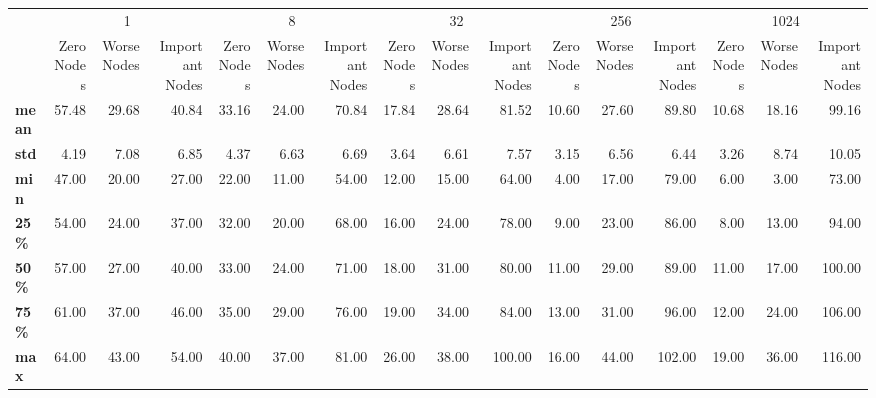 \begin{tabular}{lrrrrrrrrrrrrrrr}
\toprule
{} & \multicolumn{3}{c}{1} & \multicolumn{3}{c}{8} & \multicolumn{3}{c}{32} & \multicolumn{3}{c}{256} & \multicolumn{3}{c}{1024} \\
{} & Zero Nodes & Worse Nodes & Important Nodes & Zero Nodes & Worse Nodes & Important Nodes & Zero Nodes & Worse Nodes & Important Nodes & Zero Nodes & Worse Nodes & Important Nodes & Zero Nodes & Worse Nodes & Important Nodes \\
\midrule
\textbf{mean} &      57.48 &       29.68 &           40.84 &      33.16 &       24.00 &           70.84 &      17.84 &       28.64 &           81.52 &      10.60 &       27.60 &           89.80 &      10.68 &       18.16 &           99.16 \\
\textbf{std } &       4.19 &        7.08 &            6.85 &       4.37 &        6.63 &            6.69 &       3.64 &        6.61 &            7.57 &       3.15 &        6.56 &            6.44 &       3.26 &        8.74 &           10.05 \\
\textbf{min } &      47.00 &       20.00 &           27.00 &      22.00 &       11.00 &           54.00 &      12.00 &       15.00 &           64.00 &       4.00 &       17.00 &           79.00 &       6.00 &        3.00 &           73.00 \\
\textbf{25\% } &      54.00 &       24.00 &           37.00 &      32.00 &       20.00 &           68.00 &      16.00 &       24.00 &           78.00 &       9.00 &       23.00 &           86.00 &       8.00 &       13.00 &           94.00 \\
\textbf{50\% } &      57.00 &       27.00 &           40.00 &      33.00 &       24.00 &           71.00 &      18.00 &       31.00 &           80.00 &      11.00 &       29.00 &           89.00 &      11.00 &       17.00 &          100.00 \\
\textbf{75\% } &      61.00 &       37.00 &           46.00 &      35.00 &       29.00 &           76.00 &      19.00 &       34.00 &           84.00 &      13.00 &       31.00 &           96.00 &      12.00 &       24.00 &          106.00 \\
\textbf{max } &      64.00 &       43.00 &           54.00 &      40.00 &       37.00 &           81.00 &      26.00 &       38.00 &          100.00 &      16.00 &       44.00 &          102.00 &      19.00 &       36.00 &          116.00 \\
\bottomrule
\end{tabular}

